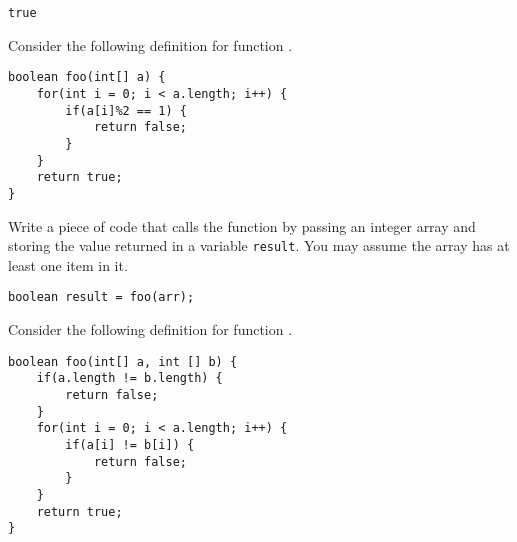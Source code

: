 \begin{questions}
\begin{solution}
\texttt{true}
\end{solution}

\question Consider the following definition for function .

\begin{lstlisting}[basicstyle=\large]
boolean foo(int[] a) {
	for(int i = 0; i < a.length; i++) {
		if(a[i]%2 == 1) {
			return false;
		}
	}
	return true;	
}
\end{lstlisting}

Write a piece of code that calls the function  by passing an integer array  and storing the value returned in a variable \texttt{result}. You may assume the array  has at least one item in it.

\begin{solution}
\begin{lstlisting}
boolean result = foo(arr);
\end{lstlisting}	
\end{solution}

\question Consider the following definition for function .

\begin{lstlisting}[basicstyle=\large]
boolean foo(int[] a, int [] b) {
	if(a.length != b.length) {
		return false;
	}
	for(int i = 0; i < a.length; i++) {
		if(a[i] != b[i]) {
			return false;
		}
	}
	return true;	
}
\end{lstlisting}



\end{questions}
